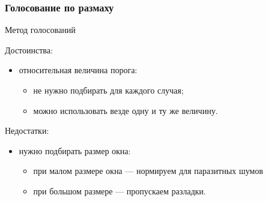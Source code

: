 \subsubsection*{Голосование по размаху}

\begin{frame}{Метод голосований}
    \begin{orange-box}{Достоинства:}
        \begin{itemize}
            \item относительная величина порога:
            \begin{itemize}
                \item не нужно подбирать для каждого случая;
                \item можно использовать везде одну и ту же величину.
            \end{itemize}
        \end{itemize}
    \end{orange-box}
    \vspace{1.5em}
    \begin{blue-box}{Недостатки:}
        \begin{itemize}
            \item нужно подбирать размер окна:
            \begin{itemize}
                \item при малом размере окна — 
                нормируем для паразитных шумов
                \item при большом размере 
                — пропускаем разладки.
            \end{itemize}
        \end{itemize}
    \end{blue-box}
\end{frame}




